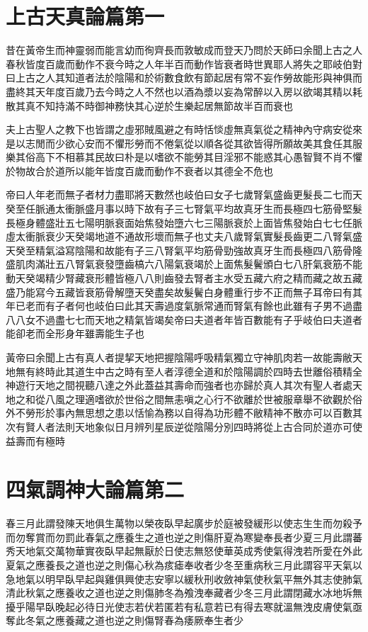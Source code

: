 \section{上古天真論篇第一}
昔在黃帝生而神靈弱而能言幼而徇齊長而敦敏成而登天乃問於天師曰余聞上古之人春秋皆度百歲而動作不衰今時之人年半百而動作皆衰者時世異耶人將失之耶岐伯對曰上古之人其知道者法於陰陽和於術數食飲有節起居有常不妄作勞故能形與神俱而盡終其天年度百歲乃去今時之人不然也以酒為漿以妄為常醉以入房以欲竭其精以耗散其真不知持滿不時御神務快其心逆於生樂起居無節故半百而衰也

夫上古聖人之教下也皆謂之虛邪賊風避之有時恬惔虛無真氣從之精神內守病安從來是以志閒而少欲心安而不懼形勞而不倦氣從以順各從其欲皆得所願故美其食任其服樂其俗高下不相慕其民故曰朴是以嗜欲不能勞其目淫邪不能惑其心愚智賢不肖不懼於物故合於道所以能年皆度百歲而動作不衰者以其德全不危也

帝曰人年老而無子者材力盡耶將天數然也岐伯曰女子七歲腎氣盛齒更髮長二七而天癸至任脈通太衝脈盛月事以時下故有子三七腎氣平均故真牙生而長極四七筋骨堅髮長極身體盛壯五七陽明脈衰面始焦發始墮六七三陽脈衰於上面皆焦發始白七七任脈虛太衝脈衰少天癸竭地道不通故形壞而無子也丈夫八歲腎氣實髮長齒更二八腎氣盛天癸至精氣溢寫陰陽和故能有子三八腎氣平均筋骨勁強故真牙生而長極四八筋骨隆盛肌肉滿壯五八腎氣衰發墮齒槁六八陽氣衰竭於上面焦髮鬢頒白七八肝氣衰筋不能動天癸竭精少腎藏衰形體皆極八八則齒發去腎者主水受五藏六府之精而藏之故五藏盛乃能寫今五藏皆衰筋骨解墮天癸盡矣故髮鬢白身體重行步不正而無子耳帝曰有其年已老而有子者何也岐伯曰此其天壽過度氣脈常通而腎氣有餘也此雖有子男不過盡八八女不過盡七七而天地之精氣皆竭矣帝曰夫道者年皆百數能有子乎岐伯曰夫道者能卻老而全形身年雖壽能生子也

黃帝曰余聞上古有真人者提挈天地把握陰陽呼吸精氣獨立守神肌肉若一故能壽敝天地無有終時此其道生中古之時有至人者淳德全道和於陰陽調於四時去世離俗積精全神遊行天地之間視聽八達之外此蓋益其壽命而強者也亦歸於真人其次有聖人者處天地之和從八風之理適嗜欲於世俗之間無恚嗔之心行不欲離於世被服章舉不欲觀於俗外不勞形於事內無思想之患以恬愉為務以自得為功形體不敝精神不散亦可以百數其次有賢人者法則天地象似日月辨列星辰逆從陰陽分別四時將從上古合同於道亦可使益壽而有極時


\section{四氣調神大論篇第二}

春三月此謂發陳天地俱生萬物以榮夜臥早起廣步於庭被發緩形以使志生生而勿殺予而勿奪賞而勿罰此春氣之應養生之道也逆之則傷肝夏為寒變奉長者少夏三月此謂蕃秀天地氣交萬物華實夜臥早起無厭於日使志無怒使華英成秀使氣得洩若所愛在外此夏氣之應養長之道也逆之則傷心秋為痎瘧奉收者少冬至重病秋三月此謂容平天氣以急地氣以明早臥早起與雞俱興使志安寧以緩秋刑收斂神氣使秋氣平無外其志使肺氣清此秋氣之應養收之道也逆之則傷肺冬為飧洩奉藏者少冬三月此謂閉藏水冰地坼無擾乎陽早臥晚起必待日光使志若伏若匿若有私意若已有得去寒就溫無洩皮膚使氣亟奪此冬氣之應養藏之道也逆之則傷腎春為痿厥奉生者少

